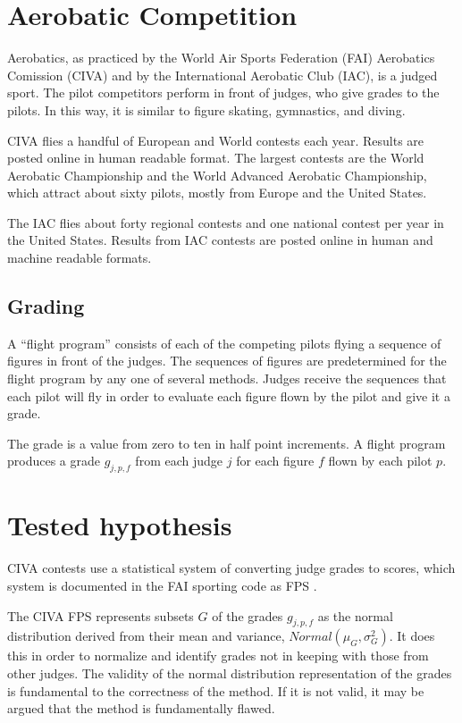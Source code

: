 \section{Aerobatic Competition}

Aerobatics, as practiced by the World Air Sports Federation (FAI)
Aerobatics Comission (CIVA) and by the International Aerobatic Club (IAC),
is a judged sport. The pilot competitors perform in front of judges, who
give grades to the pilots. In this way, it is similar to figure skating,
gymnastics, and diving.

CIVA flies a handful of European and World contests each year.
Results are posted online \cite{civa-results} in human readable format.
The largest contests are the World Aerobatic Championship \cite{wac}
and the World Advanced Aerobatic Championship, which attract about sixty
pilots, mostly from Europe and the United States.

The IAC flies about forty regional contests and one national contest
per year in the United States.
Results from IAC contests are posted online \cite{iaccdb}
in human and machine readable formats.

\subsection{Grading}

A ``flight program'' consists of each of the competing pilots flying a sequence
of figures in front of the judges. The sequences of figures are predetermined
for the flight program by any one of several methods.
Judges receive the sequences that each pilot will fly in order to evaluate
each figure flown by the pilot and give it a grade.

The grade is a value from zero to ten in half point increments.
A flight program produces a grade $g_{j,p,f}$
from each judge $j$ for each figure $f$ flown by each pilot $p$.

\section{Tested hypothesis}

CIVA contests use a statistical system of converting judge grades to scores,
which system is documented in the FAI sporting code as FPS \cite{fps}.

The CIVA FPS represents subsets $G$ of the grades $g_{j,p,f}$
as the normal distribution derived from their mean and variance,
$Normal(\mu_G, \sigma^2_G)$.
It does this in order to normalize and
identify grades not in keeping with those from other judges.
The validity of the normal distribution
representation of the grades is fundamental to the correctness of the
method.  If it is not valid, it may be argued that the method is fundamentally
flawed.

